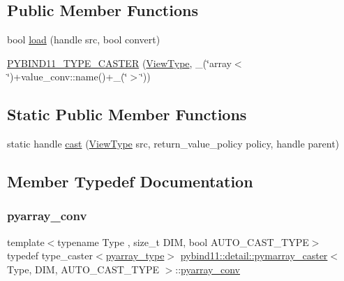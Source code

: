 \subsection*{Public Member Functions}
\begin{DoxyCompactItemize}
\item 
bool \hyperlink{structpybind11_1_1detail_1_1pymarray__caster_a86104f2febd079f88902bfbcaf211275}{load} (handle src, bool convert)
\item 
\hyperlink{structpybind11_1_1detail_1_1pymarray__caster_a40c677529b61ffbe09c3031a28c17bfd}{P\+Y\+B\+I\+N\+D11\+\_\+\+T\+Y\+P\+E\+\_\+\+C\+A\+S\+T\+ER} (\hyperlink{structpybind11_1_1detail_1_1pymarray__caster_a0593b33c0ed08f1b25b34dbc3da1b01c}{View\+Type}, \+\_\+(\char`\"{}array$<$\char`\"{})+value\+\_\+conv\+::name()+\+\_\+(\char`\"{}$>$\char`\"{}))
\end{DoxyCompactItemize}
\subsection*{Static Public Member Functions}
\begin{DoxyCompactItemize}
\item 
static handle \hyperlink{structpybind11_1_1detail_1_1pymarray__caster_ac614bd95690d2ab5f17c3b2603485404}{cast} (\hyperlink{structpybind11_1_1detail_1_1pymarray__caster_a0593b33c0ed08f1b25b34dbc3da1b01c}{View\+Type} src, return\+\_\+value\+\_\+policy policy, handle parent)
\end{DoxyCompactItemize}


\subsection{Member Typedef Documentation}
\mbox{\label{structpybind11_1_1detail_1_1pymarray__caster_a0fe8ba6e31f03c24d130c0dba1a55fa8}} 
\subsubsection{\texorpdfstring{pyarray\+\_\+conv}{pyarray\_conv}}
{\footnotesize\ttfamily template$<$typename Type , size\+\_\+t D\+IM, bool A\+U\+T\+O\+\_\+\+C\+A\+S\+T\+\_\+\+T\+Y\+PE$>$ \\
typedef type\+\_\+caster$<$\hyperlink{structpybind11_1_1detail_1_1pymarray__caster_a70ad611a7f6fd17d02b461c43dff6ea0}{pyarray\+\_\+type}$>$ \hyperlink{structpybind11_1_1detail_1_1pymarray__caster}{pybind11\+::detail\+::pymarray\+\_\+caster}$<$ Type, D\+IM, A\+U\+T\+O\+\_\+\+C\+A\+S\+T\+\_\+\+T\+Y\+PE $>$\+::\hyperlink{structpybind11_1_1detail_1_1pymarray__caster_a0fe8ba6e31f03c24d130c0dba1a55fa8}{pyarray\+\_\+conv}}


